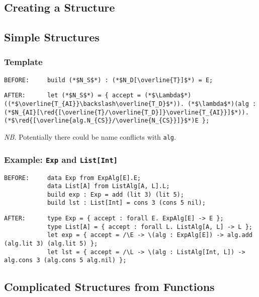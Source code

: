 \documentclass{article}
\newcommand{\red}[1]{\textcolor{red}{#1}}
\newcommand{\nb}{\textit{NB. }}
\begin{document}
\begin{spacing}{1.1}
\section{Creating a Structure}

\subsection{Simple Structures}

\subsubsection{Template}

\begin{lstlisting}[numbers=none]
BEFORE:     build (*$N_S$*) : (*$N_D[\overline{T}]$*) = E;
\end{lstlisting}
\begin{lstlisting}[numbers=none]
AFTER:      let (*$N_S$*) = { accept = (*$\Lambda$*)((*$\overline{T_{AI}}\backslash\overline{T_D}$*)). (*$\lambda$*)(alg : (*$N_{AI}[\red{[\overline{T}/\overline{T_D}]}\overline{T_{AI}}]$*)). (*$\red{[\overline{alg.N_{CS}}/\overline{N_{CS}}]}$*)E };
\end{lstlisting}

\nb Potentially there could be name conflicts with \lstinline{alg}.

\subsubsection{Example: \lstinline{Exp} and \lstinline{List[Int]}}

\begin{lstlisting}[numbers=none]
BEFORE:     data Exp from ExpAlg[E].E;
            data List[A] from ListAlg[A, L].L;
            build exp : Exp = add (lit 3) (lit 5);
            build lst : List[Int] = cons 3 (cons 5 nil);
\end{lstlisting}
\begin{lstlisting}[numbers=none]
AFTER:      type Exp = { accept : forall E. ExpAlg[E] -> E };
            type List[A] = { accept : forall L. ListAlg[A, L] -> L };
            let exp = { accept = /\E -> \(alg : ExpAlg[E]) -> alg.add (alg.lit 3) (alg.lit 5) };
            let lst = { accept = /\L -> \(alg : ListAlg[Int, L]) -> alg.cons 3 (alg.cons 5 alg.nil) };
\end{lstlisting}

\subsection{Complicated Structures from Functions}


\end{spacing}
\end{document}
